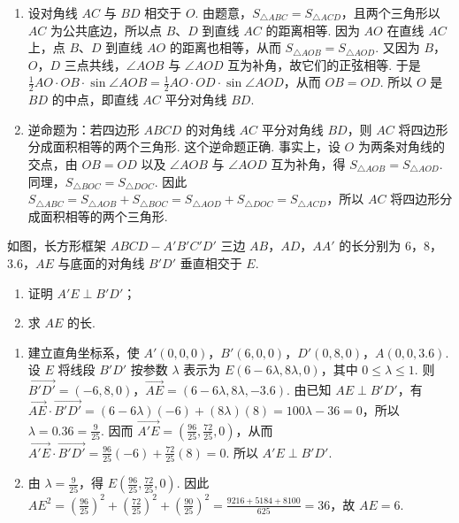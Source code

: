 \documentclass[UTF8,a4paper,oneside,11pt]{ctexbook}
\begin{document}
\begin{solution}
\begin{enumerate}
\item 设对角线 \(AC\) 与 \(BD\) 相交于 \(O\). 由题意，\(S_{\triangle ABC}=S_{\triangle ACD}\)，且两个三角形以 \(AC\) 为公共底边，所以点 \(B\)、\(D\) 到直线 \(AC\) 的距离相等. 因为 \(AO\) 在直线 \(AC\) 上，点 \(B\)、\(D\) 到直线 \(AO\) 的距离也相等，从而 \(S_{\triangle AOB}=S_{\triangle AOD}\). 又因为 \(B\)，\(O\)，\(D\) 三点共线，\(\angle AOB\) 与 \(\angle AOD\) 互为补角，故它们的正弦相等. 于是 \(\frac12 AO\cdot OB\cdot\sin\angle AOB=\frac12 AO\cdot OD\cdot\sin\angle AOD\)，从而 \(OB=OD\). 所以 \(O\) 是 \(BD\) 的中点，即直线 \(AC\) 平分对角线 \(BD\).
\item 逆命题为：若四边形 \(ABCD\) 的对角线 \(AC\) 平分对角线 \(BD\)，则 \(AC\) 将四边形分成面积相等的两个三角形. 这个逆命题正确. 事实上，设 \(O\) 为两条对角线的交点，由 \(OB=OD\) 以及 \(\angle AOB\) 与 \(\angle AOD\) 互为补角，得 \(S_{\triangle AOB}=S_{\triangle AOD}\). 同理，\(S_{\triangle BOC}=S_{\triangle DOC}\). 因此 \(S_{\triangle ABC}=S_{\triangle AOB}+S_{\triangle BOC}=S_{\triangle AOD}+S_{\triangle DOC}=S_{\triangle ACD}\)，所以 \(AC\) 将四边形分成面积相等的两个三角形.
\end{enumerate}
\end{solution}

\begin{problem}
如图，长方形框架 \(ABCD-A'B'C'D'\) 三边 \(AB\)，\(AD\)，\(AA'\) 的长分别为 \(6\)，\(8\)，\(3.6\)，\(AE\) 与底面的对角线 \(B'D'\) 垂直相交于 \(E\).

\begin{enumerate}
\item 证明 \(A'E\perp B'D'\)；
\item 求 \(AE\) 的长.
\end{enumerate}

\end{problem}

\begin{solution}
\begin{enumerate}
\item 建立直角坐标系，使 \(A'(0,0,0)\)，\(B'(6,0,0)\)，\(D'(0,8,0)\)，\(A(0,0,3.6)\). 设 \(E\) 将线段 \(B'D'\) 按参数 \(\lambda\) 表示为 \(E(6-6\lambda,8\lambda,0)\)，其中 \(0\leqslant\lambda\leqslant1\). 则 \(\overrightarrow{B'D'}=(-6,8,0)\)，\(\overrightarrow{AE}=(6-6\lambda,8\lambda,-3.6)\). 由已知 \(AE\perp B'D'\)，有 \(\overrightarrow{AE}\cdot\overrightarrow{B'D'}=(6-6\lambda)(-6)+(8\lambda)(8)=100\lambda-36=0\)，所以 \(\lambda=0.36=\frac{9}{25}\). 因而 \(\overrightarrow{A'E}=\left(\frac{96}{25},\frac{72}{25},0\right)\)，从而 \(\overrightarrow{A'E}\cdot\overrightarrow{B'D'}=\frac{96}{25}(-6)+\frac{72}{25}(8)=0\). 所以 \(A'E\perp B'D'\).
\item 由 \(\lambda=\frac{9}{25}\)，得 \(E\left(\frac{96}{25},\frac{72}{25},0\right)\). 因此 \(AE^2=\left(\frac{96}{25}\right)^2+\left(\frac{72}{25}\right)^2+\left(\frac{90}{25}\right)^2=\frac{9216+5184+8100}{625}=36\)，故 \(AE=6\).
\end{enumerate}
\end{solution}
\end{document}
